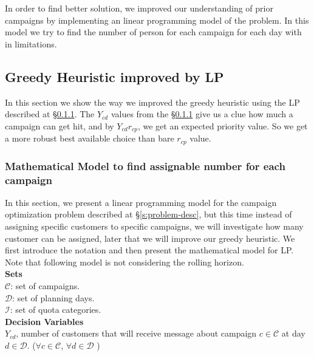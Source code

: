 \documentclass[11pt]{article}
\begin{document}
In order to find better solution, we improved our understanding of prior campaigns by implementing an linear programming model of the problem. In this model we try to find the number of person for each campaign for each day with in limitations.


\subsection{Greedy Heuristic improved by LP} \label{s:greedy_heuristic_improved}
In this section we show the way we improved the greedy heuristic using the LP described at \S \ref{s:problem-math-lp}. The $Y_{{c}{d}}$ values from the \S \ref{s:problem-math-lp} give us a clue how much a campaign can get hit, and by $Y_{{c}{d}} r_{{c}{p}}$, we get an expected priority value. So we get a more robust best available choice than bare $r_{{c}{p}}$ value.\\

\subsubsection{Mathematical Model to find assignable number for each campaign} \label{s:problem-math-lp}

In this section, we present a linear programming model for the campaign optimization problem described at \S \ref{s:problem-desc}, but this time instead of assigning specific customers to specific campaigns, we will investigate how many customer can be assigned, later that we will improve our greedy heuristic. We first introduce the notation and then present the mathematical model for LP. Note that following model is not considering the rolling horizon.\\

\noindent \textbf{Sets}\\

\noindent ${\mathcal{C}}$: set of campaigns. \\
\noindent ${\mathcal{D}}$: set of planning days. \\
\noindent ${\mathcal{I}}$: set of quota categories. \\

\noindent \textbf{Decision Variables}\\

\noindent $Y_{{c}{d}}$, number of customers that will receive message about campaign $c \in \mathcal{C}$ at day $d \in \mathcal{D}$.
($\forall c \in \mathcal{C}$, $\forall d \in \mathcal{D}$ )\\
\\
\end{document}

